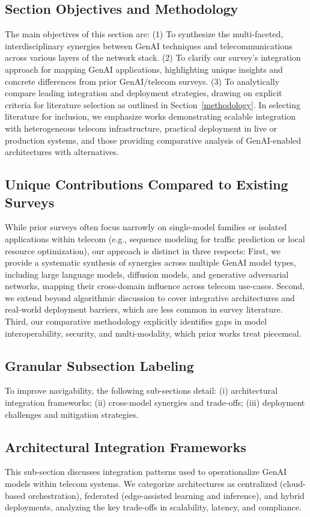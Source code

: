 \documentclass[sigconf]{acmart}
\begin{document}
\subsection{Section Objectives and Methodology} 
The main objectives of this section are:
(1) To synthesize the multi-faceted, interdisciplinary synergies between GenAI techniques and telecommunications across various layers of the network stack.
(2) To clarify our survey's integration approach for mapping GenAI applications, highlighting unique insights and concrete differences from prior GenAI/telecom surveys.
(3) To analytically compare leading integration and deployment strategies, drawing on explicit criteria for literature selection as outlined in Section~\ref{methodology}.
In selecting literature for inclusion, we emphasize works demonstrating scalable integration with heterogeneous telecom infrastructure, practical deployment in live or production systems, and those providing comparative analysis of GenAI-enabled architectures with alternatives.

\subsection{Unique Contributions Compared to Existing Surveys} 
While prior surveys often focus narrowly on single-model families or isolated applications within telecom (e.g., sequence modeling for traffic prediction or local resource optimization), our approach is distinct in three respects:
First, we provide a systematic synthesis of synergies across multiple GenAI model types, including large language models, diffusion models, and generative adversarial networks, mapping their cross-domain influence across telecom use-cases.
Second, we extend beyond algorithmic discussion to cover integrative architectures and real-world deployment barriers, which are less common in survey literature.
Third, our comparative methodology explicitly identifies gaps in model interoperability, security, and multi-modality, which prior works treat piecemeal.

\subsection{Granular Subsection Labeling}
To improve navigability, the following sub-sections detail: (i) architectural integration frameworks; (ii) cross-model synergies and trade-offs; (iii) deployment challenges and mitigation strategies.

\subsection{Architectural Integration Frameworks}
This sub-section discusses integration patterns used to operationalize GenAI models within telecom systems. We categorize architectures as centralized (cloud-based orchestration), federated (edge-assisted learning and inference), and hybrid deployments, analyzing the key trade-offs in scalability, latency, and compliance.
\end{document}
